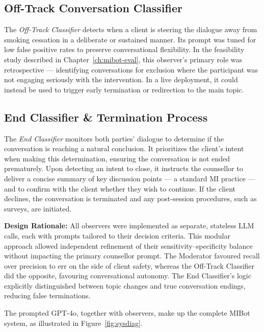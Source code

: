 \subsection{Off-Track Conversation Classifier}
The \textit{Off-Track Classifier} detects when a client is steering the dialogue away from smoking cessation in a deliberate or sustained manner. Its prompt was tuned for low false positive rates to preserve conversational flexibility. In the feasibility study described in Chapter~\ref{ch:mibot-eval}, this observer's primary role was retrospective --- identifying conversations for exclusion where the participant was not engaging seriously with the intervention. In a live deployment, it could instead be used to trigger early termination or redirection to the main topic.

\subsection{End Classifier \& Termination Process}
The \textit{End Classifier} monitors both parties' dialogue to determine if the conversation is reaching a natural conclusion. It prioritizes the client's intent when making this determination, ensuring the conversation is not ended prematurely. Upon detecting an intent to close, it instructs the counsellor to deliver a concise summary of key discussion points --- a standard MI practice --- and to confirm with the client whether they wish to continue. If the client declines, the conversation is terminated and any post-session procedures, such as surveys, are initiated.


\textbf{Design Rationale:} All observers were implemented as separate, stateless LLM calls, each with prompts tailored to their decision criteria. This modular approach allowed independent refinement of their sensitivity–specificity balance without impacting the primary counsellor prompt. The Moderator favoured recall over precision to err on the side of client safety, whereas the Off-Track Classifier did the opposite, favouring conversational autonomy. The End Classifier's logic explicitly distinguished between topic changes and true conversation endings, reducing false terminations.


The prompted GPT-4o, together with observers, make up the complete MIBot system, as illustrated in Figure~\ref{fig:sysdiag}.





